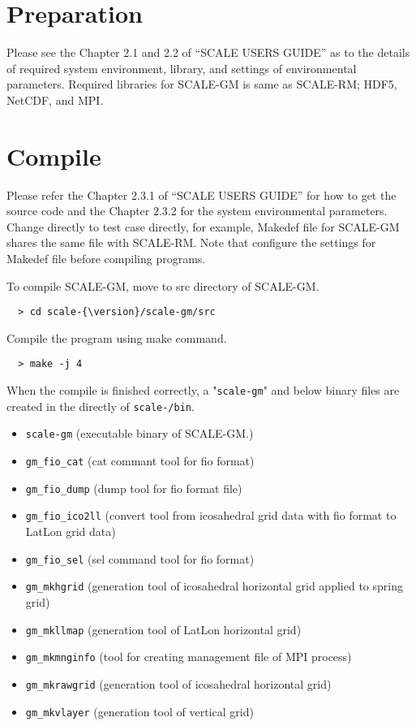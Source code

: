 

\section{Preparation}
Please see the Chapter 2.1 and 2.2 of ``SCALE USERS GUIDE''
as to the details of required system environment, library, and settings of environmental parameters.
Required libraries for SCALE-GM is same as SCALE-RM; HDF5, NetCDF, and MPI.

\section{Compile}
Please refer the Chapter 2.3.1 of ``SCALE USERS GUIDE'' for how to get the source code
and the Chapter 2.3.2 for the system environmental parameters.
Change directly to test case directly, for example,
Makedef file for SCALE-GM shares the same file with SCALE-RM.
Note that configure the settings for Makedef file before compiling programs.


\noindent To compile SCALE-GM, move to src directory of SCALE-GM.

\begin{verbatim}
  > cd scale-{\version}/scale-gm/src
\end{verbatim}

\noindent Compile the program using make command.
\begin{verbatim}
  > make -j 4
\end{verbatim}
When the compile is finished correctly,
a "\verb|scale-gm|" and below binary files are created in the directly of \texttt{scale-{\version}/bin}.
 \begin{itemize}
   \item \verb|scale-gm| (executable binary of SCALE-GM.)
   \item  \verb|gm_fio_cat| (cat commant tool for fio format)
   \item  \verb|gm_fio_dump| (dump tool for fio format file)
   \item  \verb|gm_fio_ico2ll| (convert tool from icosahedral grid data with fio format to LatLon grid data)
   \item  \verb|gm_fio_sel| (sel command tool for fio format)
   \item  \verb|gm_mkhgrid| (generation tool of icosahedral horizontal grid applied to spring grid)
   \item  \verb|gm_mkllmap| (generation tool of LatLon horizontal grid)
   \item  \verb|gm_mkmnginfo| (tool for creating management file of MPI process)
   \item  \verb|gm_mkrawgrid| (generation tool of icosahedral horizontal grid)
   \item  \verb|gm_mkvlayer| (generation tool of vertical grid)
 \end{itemize}


